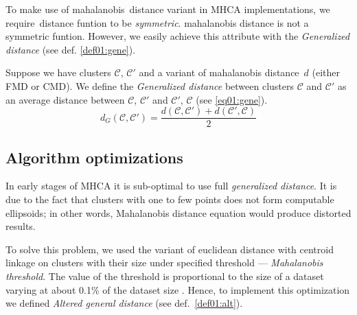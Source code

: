 \vspace{0.5cm}

To make use of  mahalanobis\ distance variant in MHCA implementations, we require\ distance funtion to be \emph{symmetric}.  mahalanobis distance is not a symmetric funtion. However, we easily achieve this attribute with the \emph{Generalized distance} (see def. \ref{def01:gene}).

\begin{defn}[???]
	Suppose we have clusters $\mathcal{C}$, $\mathcal{C}'$ and a variant of mahalanobis distance~$d$ (either FMD or CMD). We define the \emph{Generalized distance} between clusters $\mathcal{C}$ and $\mathcal{C}'$ as an average distance between $\mathcal{C}$, $\mathcal{C}'$ and $\mathcal{C}'$, $\mathcal{C}$ (see \ref{eq01:gene}).
	\begin{equation}\label{eq01:gene}
	d_G(\mathcal{C},\mathcal{C}') = \frac{d(\mathcal{C},\mathcal{C}')+d(\mathcal{C}',\mathcal{C})}{2}
	\end{equation}
	\label{def01:gene}
\end{defn}  


\subsection{Algorithm optimizations}

In early stages of MHCA it is sub-optimal to use full \emph{generalized distance}. It is due to the fact that clusters with one to few points does not form computable ellipsoids; in other words, Mahalanobis distance equation would produce distorted results. 

To solve this problem, we used the variant of euclidean distance with centroid linkage on clusters with their size under specified threshold --- \emph{Mahalanobis threshold}. The value of the threshold is proportional to the size of a dataset varying at about 0.1\% of the dataset size \cite{fivser2012detection}. Hence, to implement this optimization we defined \emph{Altered general distance} (see def.~\ref{def01:alt}).


